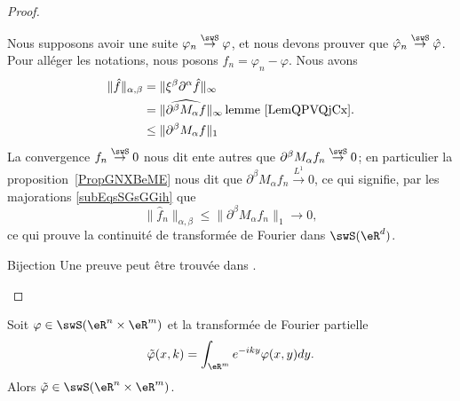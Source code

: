 \begin{proof}
\begin{subproof}
		Nous supposons avoir une suite \( \varphi_n\stackrel{\swS}{\to}\varphi\), et nous devons prouver que \( \hat\varphi_n\stackrel{\swS}{\to}\hat\varphi\). Pour alléger les notations, nous posons \( f_n=\varphi_n-\varphi\). Nous avons
		\begin{subequations}    \label{subEqsSGsGGih}
			\begin{align}
				\| \hat f \|_{\alpha,\beta} & =\| \xi^{\beta}\partial^{\alpha}\hat f \|_{\infty}                                        \\
				                            & =\| \widehat{  \partial^{\beta}M_{\alpha}f  } \|_{\infty}\,\text{lemme~\ref{LemQPVQjCx}.} \\
				                            & \leq \| \partial^{\beta}M_{\alpha}f \|_1
			\end{align}
		\end{subequations}
		La convergence \(f_n\stackrel{\swS}{\to}0\) nous dit ente autres que \( \partial^{\beta}M_{\alpha}f_n\stackrel{\swS}{\to}0\); en particulier la proposition~\ref{PropGNXBeME} nous dit que \( \partial^{\beta}M_{\alpha}f_n\stackrel{L^1}{\to}0\), ce qui signifie, par les majorations \eqref{subEqsSGsGGih} que
		\begin{equation}
			\| \hat f_n \|_{\alpha,\beta}\leq \| \partial^{\beta}M_{\alpha}f_n \|_1\to0,
		\end{equation}
		ce qui prouve la continuité de transformée de Fourier dans \( \swS(\eR^d)\).
		\item[Bijection]
		Une preuve peut être trouvée dans \cite{BMoNzTY}.
	\end{subproof}
\end{proof}

\begin{proposition}     \label{PROPooMVQMooGYAzSX}
	Soit \( \varphi\in\swS(\eR^n\times \eR^m)\) et la transformée de Fourier partielle
	\begin{equation}
		\tilde \varphi(x,k)=\int_{\eR^m}  e^{-iky}\varphi(x,y)dy.
	\end{equation}
	Alors \( \tilde \varphi\in\swS(\eR^n\times \eR^m  )\).
\end{proposition}

